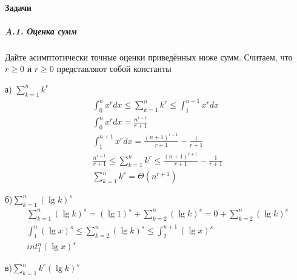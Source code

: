 \paragraph{Задачи}
\subparagraph{A.1. Оценка сумм}

Дайте асимптотически точные оценки приведённых ниже сумм. Считаем, что $r \geq  0$ и $r \geq 0$ представляют собой константы

а) $\sum_{k=1}^{n} {k^r}$
\begin{gather*}
\int_{0}^{n} {x^rdx} \leq \sum_{k=1}^{n} {k^r} \leq \int_{1}^{n+1} {x^rdx} \\
\int_{0}^{n} {x^rdx} = \frac{n^{r+1}}{r+1} \\
\int_{1}^{n+1} {x^rdx} = \frac{(n+1)^{r+1}}{r+1} - \frac{1}{r+1} \\
\frac{n^{r+1}}{r+1} \leq \sum_{k=1}^{n} {k^r} \leq \frac{(n+1)^{r+1}}{r+1} - \frac{1}{r+1} \\
\sum_{k=1}^{n} {k^r} = \Theta(n^{r+1})
\end{gather*}

б)$\sum_{k=1}^{n}{(\lg{k})^s}$
\begin{gather*}
\sum_{k=1}^{n}{(\lg{k})^s} = (\lg{1})^s + \sum_{k=2}^{n}{(\lg{k})^s} = 0 + \sum_{k=2}^{n}{(\lg{k})^s}\\
\int_{1}^{n} {(\lg{x})^s} \leq \sum_{k=2}^{n}{(\lg{k})^s} \leq \int_{2}^{n+1} {(\lg{x})^s} \\
int_{1}^{n} {(\lg{x})^s}
\end{gather*}

в)$\sum_{k=1}^{n}{k^r(\lg{k})^s}$